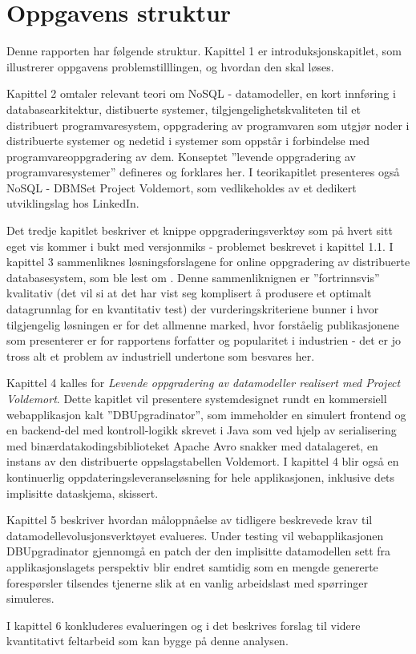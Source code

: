 \section{Oppgavens struktur}

Denne rapporten har følgende struktur. Kapittel 1 er introduksjonskapitlet, som illustrerer oppgavens problemstilllingen, og hvordan den skal løses.

Kapittel 2 omtaler relevant teori om NoSQL - datamodeller, en kort innføring i databasearkitektur, distibuerte systemer, tilgjengelighetskvaliteten til et distribuert programvaresystem, oppgradering av programvaren som utgjør noder i distribuerte systemer og nedetid i systemer som oppstår i forbindelse med programvareoppgradering av dem. Konseptet ''levende oppgradering av programvaresystemer'' defineres og forklares her. I teorikapitlet presenteres også NoSQL - DBMSet Project Voldemort, som vedlikeholdes av et dedikert utviklingslag hos LinkedIn.

Det tredje kapitlet beskriver et knippe oppgraderingsverktøy som på hvert sitt eget vis kommer i bukt med versjonmiks - problemet beskrevet i kapittel 1.1. I kapittel 3 sammenliknes løsningsforslagene for online oppgradering av distribuerte databasesystem, som ble lest om . Denne sammenliknignen er ''fortrinnsvis'' kvalitativ (det vil si at det har vist seg komplisert å produsere et optimalt datagrunnlag for en kvantitativ test) der vurderingskriteriene bunner i hvor tilgjengelig løsningen er for det allmenne marked, hvor forståelig publikasjonene som presenterer er for rapportens forfatter og popularitet i industrien - det er jo tross alt et problem av industriell undertone som besvares her.

Kapittel 4 kalles for \emph{Levende oppgradering av datamodeller realisert med Project Voldemort}. Dette kapitlet vil presentere systemdesignet rundt en kommersiell webapplikasjon kalt ''DBUpgradinator'', som immeholder en simulert frontend og en backend-del med kontroll-logikk skrevet i Java som ved hjelp av serialisering med binærdatakodingsbiblioteket Apache Avro snakker med datalageret, en instans av den distribuerte oppslagstabellen Voldemort. I kapittel 4 blir også en kontinuerlig oppdateringsleveranseløsning for hele applikasjonen, inklusive dets implisitte dataskjema, skissert.

Kapittel 5 beskriver hvordan måloppnåelse av tidligere beskrevede krav til datamodellevolusjonsverktøyet evalueres. Under testing vil webapplikasjonen DBUpgradinator gjennomgå en patch der den implisitte datamodellen sett fra applikasjonslagets perspektiv blir endret samtidig som en mengde genererte forespørsler tilsendes tjenerne slik at en vanlig arbeidslast med spørringer simuleres.

I kapittel 6 konkluderes evalueringen og i det beskrives forslag til videre kvantitativt feltarbeid som kan bygge på denne analysen.

